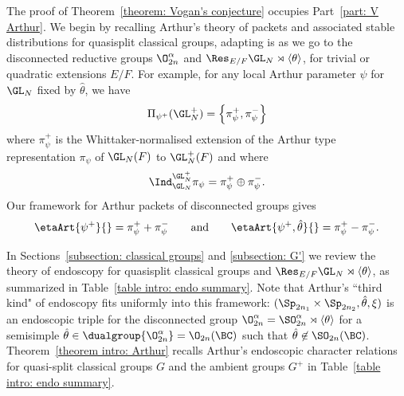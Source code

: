 \documentclass[11pt,letterpaper]{amsart}
\numberwithin{equation}{section}
\begin{document}
The proof of Theorem~\ref{theorem: Vogan's conjecture} occupies Part~\ref{part: V Arthur}. 
We begin by recalling Arthur's theory of packets and associated stable distributions for quasisplit classical groups, adapting is as we go to the disconnected reductive groups $\O^{\alpha}_{2n}$ and $ \Res_{E/F}\GL_N\rtimes{\langle\theta\rangle}$, for trivial or quadratic extensions $E/F$. 
For example, for any local Arthur parameter $\psi$ for $\GL_N$ fixed by $\widehat{\theta}$, we have 
\begin{equation}
    \Pi_{\psi^+}(\GL_N^+)
    =
    \left\{
    \pi_\psi^+, \pi_\psi^-
    \right\}  
\end{equation}
where $\pi_\psi^+$ is the Whittaker-normalised extension of the Arthur type representation $\pi_\psi$ of $\GL_N(F)$ to $\GL_N^+(F)$ and where 
\begin{equation}
\Ind^{\GL_N^+}_{\GL_N} \pi_\psi = \pi_\psi^+\oplus \pi_\psi^-.
\end{equation}
Our framework for Arthur packets of disconnected groups gives
\[
\etaArt{\psi^+}{}
=
\pi_\psi^+ + \pi_\psi^-
\qquad\text{and}\qquad
\etaArt{\psi^+,{\hat\theta}}{}
=
\pi_\psi^+ - \pi_\psi^-
.
\]

In Sections~\ref{subsection: classical groups} and \ref{subsection: G'} we review the theory of endoscopy for quasisplit classical groups and $\Res_{E/F}\GL_N\rtimes{\langle\theta\rangle}$,
as summarized in Table~\ref{table intro: endo summary}.
 Note that Arthur's ``third kind" of endoscopy fits uniformly into this framework: $(\Sp_{2n_1}\times\Sp_{2n_2},{\hat\theta},\xi)$ is an endoscopic triple for the disconnected group $\O^{\alpha}_{2n} = \SO^\alpha_{2n}\rtimes\langle\theta\rangle$ 
for a semisimple ${\hat\theta}\in \dualgroup{\O^\alpha_{2n}} = 
\O_{2n}(\BC)$ such that ${\hat\theta}\not\in \SO_{2n}(\BC)$.
%
Theorem~\ref{theorem intro: Arthur} recalls Arthur's endoscopic character relations for quasi-split classical groups $G$ and the ambient groups $G^+$ in Table~\ref{table intro: endo summary}.
\end{document}
